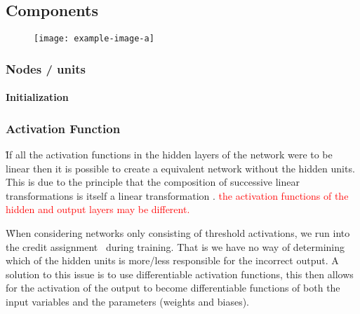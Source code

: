 \subsection{Components}

\begin{figure}[htp]
	\centering
	\texttt{[image: example-image-a]}\hfil
	\caption{}
	\label{fig:foundations_ann_overview}
\end{figure}


\subsubsection{Nodes / units}

\paragraph{Initialization}



\subsubsection{Activation Function}


\r{If all the activation functions in the hidden layers of the network were to be linear then it is possible to create a equivalent network without the hidden units. This is due to the principle that the composition of successive linear transformations is itself a linear transformation . \textcolor{red}{the activation functions of the hidden and output layers may be different.}}


\r{When considering networks only consisting of threshold activations, we run into the {credit assignment}~ during training. That is we have no way of determining which of the hidden units is more/less responsible for the incorrect output.  A solution to this issue is to use differentiable activation functions, this then allows for the activation of the output to become differentiable functions of both the input variables and the parameters (weights and biases).}

